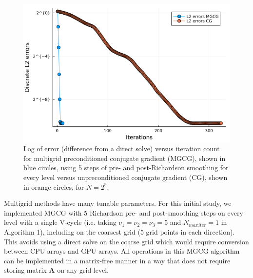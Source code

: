 \begin{figure}[t]
    \centering
    \includegraphics[width=\linewidth]{figures/64_L2_errors.png}
    \caption{Log of error (difference from a direct solve) versus iteration count for multigrid preconditioned conjugate gradient (MGCG), shown in blue circles, using 5 steps of pre- and post-Richardson smoothing for every level versus unpreconditioned conjugate gradient (CG), shown in orange circles, for $N = 2^5$.}
    \label{fig:mgcg_conv}
\end{figure}
%
%



Multigrid methods have many tunable parameters. For this initial study, we implemented MGCG with 5 Richardson pre- and  post-smoothing steps on every level with a single V-cycle (i.e. taking $\nu_1 = \nu_2 = \nu_3 = 5$ and $N_{maxiter} = 1$ in Algorithm 1), including on the coarsest grid (5 grid points in each direction). This avoids using a direct solve on the coarse grid which would require conversion between CPU arrays and GPU arrays.
All operations in this MGCG algorithm can be implemented in a matrix-free manner in a way that does not require storing matrix $\boldsymbol{A}$ on any grid level.  


